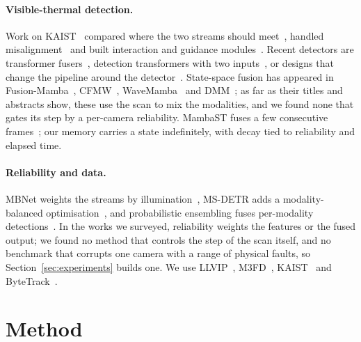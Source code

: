 \paragraph{Visible-thermal detection.}
Work on KAIST~\cite{hwang2015kaist} compared where the two streams should meet~\cite{liu2016halfway}, handled misalignment~\cite{zhang2019arcnn} and built interaction and guidance modules~\cite{zhang2019cian,zhang2021gaff,cao2023csaa}. Recent detectors are transformer fusers~\cite{fang2021cft,shen2024icafusion,shen2025irdfusion}, detection transformers with two inputs~\cite{xing2024msdetr,guo2024damsdet,xiao2024gmdetr}, or designs that change the pipeline around the detector~\cite{wan2025yolov11rgbt,zhang2024tfdet,zhang2024e2emfd,zhao2026rsdet}. State-space fusion has appeared in Fusion-Mamba~\cite{dong2025fusionmamba}, CFMW~\cite{li2025cfmw}, WaveMamba~\cite{zhu2025wavemamba} and DMM~\cite{zhou2024dmm}; as far as their titles and abstracts show, these use the scan to mix the modalities, and we found none that gates its step by a per-camera reliability. MambaST fuses a few consecutive frames~\cite{mambast2024}; our memory carries a state indefinitely, with decay tied to reliability and elapsed time.

\paragraph{Reliability and data.}
MBNet weights the streams by illumination~\cite{zhou2020mbnet}, MS-DETR adds a modality-balanced optimisation~\cite{xing2024msdetr}, and probabilistic ensembling fuses per-modality detections~\cite{chen2022proben}. In the works we surveyed, reliability weights the features or the fused output; we found no method that controls the step of the scan itself, and no benchmark that corrupts one camera with a range of physical faults, so Section~\ref{sec:experiments} builds one. We use LLVIP~\cite{jia2021llvip}, M3FD~\cite{liu2022tardal}, KAIST~\cite{hwang2015kaist,li2018kaistsanitized} and ByteTrack~\cite{zhang2022bytetrack}.

\section{Method}
\label{sec:method}
